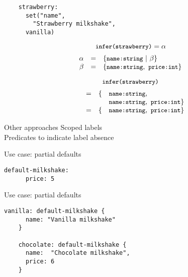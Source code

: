 \documentclass[20pt]{beamer}
\newcommand{\code}[1]{
    \texttt{\small{#1}}
}
\begin{document}
\begin{frame}
    \begin{lstlisting}
    strawberry:
      set("name",
        "Strawberry milkshake",
      vanilla)
    \end{lstlisting}
\end{frame}


\begin{frame}
    \[
    \code{infer(strawberry)} = \alpha
    \]
    \[
    \begin{array}{rcl}
    \alpha & = & \{ \code{name:} \code{string} ~ | ~ \beta  \} \\
    \beta  & = & \{ \code{name:} \code{string}, ~ \code{price:} \code{int} \} \\
    \end{array}
    \]
\end{frame}

\begin{frame}
    \[
    \code{infer(strawberry)}
    \]
    \[
    \begin{array}{llll}
    ~ & = & \{ & \code{name:} \code{string}, \\
      &   &    & \code{name:} \code{string}, ~ \code{price:} \code{int} \} \\
      & = & \{ & \code{name:} \code{string}, ~ \code{price:} \code{int} \} \\
    \end{array}
    \]
\end{frame}

\begin{frame}{Other approaches}
    Scoped labels \\
    Predicates to indicate label absence \\
\end{frame}

\begin{frame}[fragile]{Use case: partial defaults}
    \begin{lstlisting}[keywords = {}]
    default-milkshake:
      price: 5
    \end{lstlisting}
\end{frame}

\begin{frame}[fragile]{Use case: partial defaults}
    \begin{lstlisting}[keywords = {}]
    vanilla: default-milkshake {
      name: "Vanilla milkshake"
    }

    chocolate: default-milkshake {
      name:  "Chocolate milkshake",
      price: 6
    }
    \end{lstlisting}
\end{frame}
\end{document}
